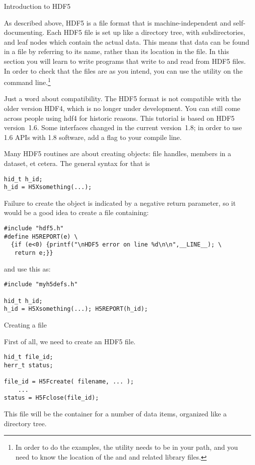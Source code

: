  {Introduction to HDF5}

As described above, HDF5 is a file format that is machine-independent
and self-documenting. Each HDF5 file is set up like a directory tree,
with subdirectories, and leaf nodes which contain the actual
data. This means that data can be found in a file by referring to its
name, rather than its location in the file. In this section you will
learn to write programs that write to and read from HDF5 files. In
order to check that the files are as you intend, you can use the
 utility on the command line.\footnote{In order to do the
  examples, the  utility needs to be in your path, and you
  need to know the location of the  and  and
  related library files.}

Just a word about compatibility. The HDF5 format is not compatible
with the older version HDF4, which is no longer under development. You
can still come across people using hdf4 for historic reasons. This
tutorial is based on HDF5 version~1.6. Some interfaces changed in the
current version~1.8; in order to use 1.6 APIs with 1.8 software, add a
flag  to your compile line.

Many HDF5 routines are about creating objects: file handles, members
in a dataset, et cetera. The general syntax for that is
\begin{verbatim}
hid_t h_id;
h_id = H5Xsomething(...);
\end{verbatim}
Failure to create the object is indicated by a negative return
parameter, so it would be a good idea to create a file
  containing:
\begin{verbatim}
#include "hdf5.h"
#define H5REPORT(e) \
  {if (e<0) {printf("\nHDF5 error on line %d\n\n",__LINE__); \
   return e;}}
\end{verbatim}
and use this as:
\begin{verbatim}
#include "myh5defs.h"

hid_t h_id;
h_id = H5Xsomething(...); H5REPORT(h_id);
\end{verbatim}

 {Creating a file}

First of all, we need to create an HDF5 file.
\begin{verbatim}
hid_t file_id;
herr_t status;

file_id = H5Fcreate( filename, ... );
    ...
status = H5Fclose(file_id); 
\end{verbatim}
This file will be the container for a number of data items, organized
like a directory tree.

